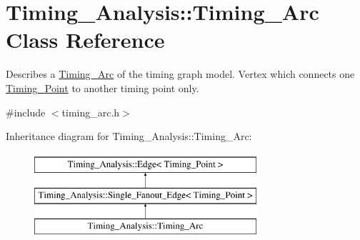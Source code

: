 \hypertarget{classTiming__Analysis_1_1Timing__Arc}{\section{Timing\-\_\-\-Analysis\-:\-:Timing\-\_\-\-Arc Class Reference}
\label{classTiming__Analysis_1_1Timing__Arc}
}


Describes a \hyperlink{classTiming__Analysis_1_1Timing__Arc}{Timing\-\_\-\-Arc} of the timing graph model. Vertex which connects one \hyperlink{classTiming__Analysis_1_1Timing__Point}{Timing\-\_\-\-Point} to another timing point only.  




{\ttfamily \#include $<$timing\-\_\-arc.\-h$>$}

Inheritance diagram for Timing\-\_\-\-Analysis\-:\-:Timing\-\_\-\-Arc\-:\begin{figure}[H]
\begin{center}
\leavevmode
\includegraphics[height=3.000000cm]{classTiming__Analysis_1_1Timing__Arc}
\end{center}
\end{figure}
